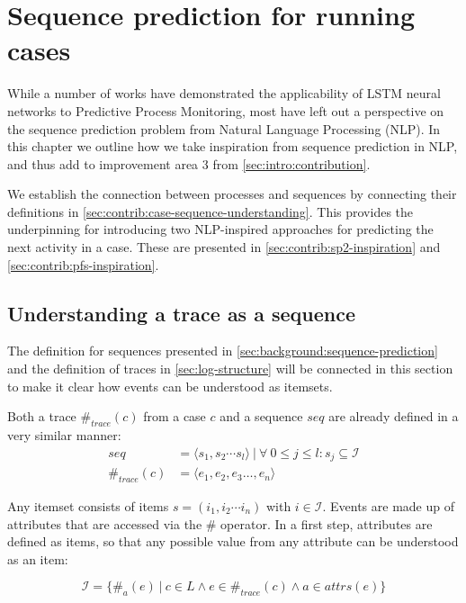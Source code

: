 \chapter{Sequence prediction for running cases}
\label{chap:taking-inspiration}
While a number of works have demonstrated the applicability of LSTM neural networks to Predictive Process Monitoring, most have left out a perspective on the sequence prediction problem from Natural Language Processing (NLP). In this chapter we outline how we take inspiration from sequence prediction in NLP, and thus add to improvement area 3 from \autoref{sec:intro:contribution}.

We establish the connection between processes and sequences by connecting their definitions in \autoref{sec:contrib:case-sequence-understanding}. This provides the underpinning for introducing two NLP-inspired approaches for predicting the next activity in a case. These are presented in \autoref{sec:contrib:sp2-inspiration} and \autoref{sec:contrib:pfs-inspiration}.

\section{Understanding a trace as a sequence}\label{sec:contrib:case-sequence-understanding}
The definition for sequences presented in \autoref{sec:background:sequence-prediction} and the definition of traces in \autoref{sec:log-structure} will be connected in this section to make it clear how events can be understood as itemsets.

Both a trace $\#_{trace}(c)$ from a case $c$ and a sequence $seq$ are already defined in a very similar manner:
\begin{equation*}
\begin{split}
seq           &=  \langle s_1,s_2\cdots s_l \rangle\ |\ \forall\ 0 \leq j \leq l: s_j \subseteq \mathscr{I}\\
\#_{trace}(c) &= \langle e_1, e_2, e_3 \dots, e_n \rangle
\end{split}
\end{equation*}

Any itemset consists of items $s = (i_1, i_2 \cdots i_n)$ with $i \in \mathscr{I}$. Events are made up of attributes that are accessed via the $\#$ operator.
In a first step, attributes are defined as items, so that any possible value from any attribute can be understood as an item:

$$\mathscr{I} = \{\#_{a}(e)\ |\ c \in L\wedge e \in \#_{trace}(c) \wedge a \in attrs(e)\}$$

